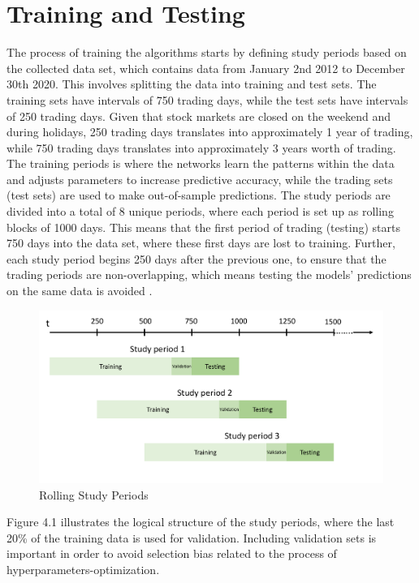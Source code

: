 \section{Training and Testing}
The process of training the algorithms starts by defining study periods based on the collected data set, which contains data from January 2nd 2012 to December 30th 2020. This involves splitting the data into training and test sets. The training sets have intervals of 750 trading days, while the test sets have intervals of 250 trading days. Given that stock markets are closed on the weekend and during holidays, 250 trading days translates into approximately 1 year of trading, while 750 trading days translates into approximately 3 years worth of trading. The training periods is where the networks learn the patterns within the data and adjusts parameters to increase predictive accuracy, while the trading sets (test sets) are used to make out-of-sample predictions. The study periods are divided into a total of 8 unique periods, where each period is set up as rolling blocks of 1000 days. This means that the first period of trading (testing) starts 750 days into the data set, where these first days are lost to training. Further, each study period begins 250 days after the previous one, to ensure that the trading periods are non-overlapping, which means testing the models' predictions on the same data is avoided \cite{krauss}. 
\indent\newline 
\begin{figure}[H]
\centering
\includegraphics [scale=0.48,angle=360]{figures/study.png}
\caption{Rolling Study Periods}
\label{fig:study}
\end{figure}

\indent\newline 
Figure 4.1 illustrates the logical structure of the study periods, where the last 20\% of the training data is used for validation. Including validation sets is important in order to avoid selection bias related to the process of hyperparameters-optimization.

